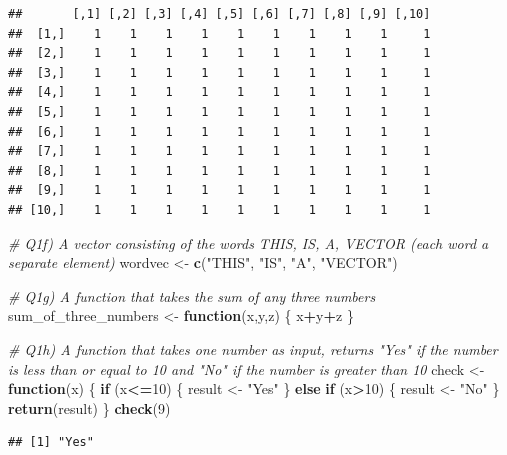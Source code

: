 \documentclass[]{article}
\newenvironment{Shaded}{\begin{snugshade}}{\end{snugshade}}
\newcommand{\KeywordTok}[1]{\textcolor[rgb]{0.13,0.29,0.53}{\textbf{#1}}}
\newcommand{\DecValTok}[1]{\textcolor[rgb]{0.00,0.00,0.81}{#1}}
\newcommand{\StringTok}[1]{\textcolor[rgb]{0.31,0.60,0.02}{#1}}
\newcommand{\CommentTok}[1]{\textcolor[rgb]{0.56,0.35,0.01}{\textit{#1}}}
\newcommand{\ControlFlowTok}[1]{\textcolor[rgb]{0.13,0.29,0.53}{\textbf{#1}}}
\newcommand{\OperatorTok}[1]{\textcolor[rgb]{0.81,0.36,0.00}{\textbf{#1}}}
\newcommand{\NormalTok}[1]{#1}
\begin{document}
\begin{verbatim}
##       [,1] [,2] [,3] [,4] [,5] [,6] [,7] [,8] [,9] [,10]
##  [1,]    1    1    1    1    1    1    1    1    1     1
##  [2,]    1    1    1    1    1    1    1    1    1     1
##  [3,]    1    1    1    1    1    1    1    1    1     1
##  [4,]    1    1    1    1    1    1    1    1    1     1
##  [5,]    1    1    1    1    1    1    1    1    1     1
##  [6,]    1    1    1    1    1    1    1    1    1     1
##  [7,]    1    1    1    1    1    1    1    1    1     1
##  [8,]    1    1    1    1    1    1    1    1    1     1
##  [9,]    1    1    1    1    1    1    1    1    1     1
## [10,]    1    1    1    1    1    1    1    1    1     1
\end{verbatim}

\begin{Shaded}
\begin{Highlighting}[]
\CommentTok{# Q1f)  A vector consisting of the words THIS, IS, A, VECTOR (each word a separate element) }
\NormalTok{wordvec <-}\StringTok{ }\KeywordTok{c}\NormalTok{(}\StringTok{"THIS"}\NormalTok{, }\StringTok{"IS"}\NormalTok{, }\StringTok{"A"}\NormalTok{, }\StringTok{"VECTOR"}\NormalTok{)}

\CommentTok{# Q1g) A function that takes the sum of any three numbers }
\NormalTok{sum_of_three_numbers <-}\StringTok{ }\ControlFlowTok{function}\NormalTok{(x,y,z) \{}
\NormalTok{  x}\OperatorTok{+}\NormalTok{y}\OperatorTok{+}\NormalTok{z}
\NormalTok{\}}

\CommentTok{# Q1h) A function that takes one number as input, returns "Yes" if the number is less than or equal to 10 and "No" if the number is greater than 10}
\NormalTok{check <-}\StringTok{ }\ControlFlowTok{function}\NormalTok{(x) \{}
  \ControlFlowTok{if}\NormalTok{ (x}\OperatorTok{<=}\DecValTok{10}\NormalTok{) \{}
\NormalTok{    result <-}\StringTok{ "Yes"}
\NormalTok{  \}}
  \ControlFlowTok{else} \ControlFlowTok{if}\NormalTok{ (x}\OperatorTok{>}\DecValTok{10}\NormalTok{) \{}
\NormalTok{    result <-}\StringTok{ "No"}
\NormalTok{  \}}
  \KeywordTok{return}\NormalTok{(result)}
\NormalTok{\}}
\KeywordTok{check}\NormalTok{(}\DecValTok{9}\NormalTok{)}
\end{Highlighting}
\end{Shaded}

\begin{verbatim}
## [1] "Yes"
\end{verbatim}
\end{document}
